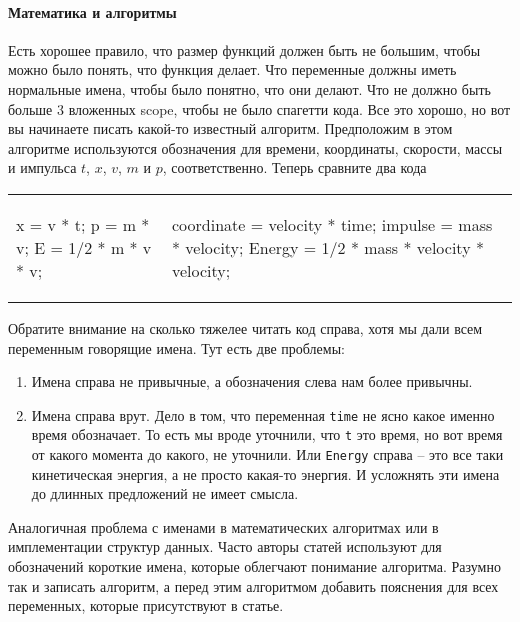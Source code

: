\paragraph{Математика и алгоритмы}

Есть хорошее правило, что размер функций должен быть не большим, чтобы можно было понять, что функция делает.
Что переменные должны иметь нормальные имена, чтобы было понятно, что они делают.
Что не должно быть больше $3$ вложенных scope, чтобы не было спагетти кода.
Все это хорошо, но вот вы начинаете писать какой-то известный алгоритм.
Предположим в этом алгоритме используются обозначения для времени, координаты, скорости, массы и импульса $t$, $x$, $v$, $m$ и $p$, соответственно.
Теперь сравните два кода
\begin{center}
\begin{tabular}{ll}
{
\begin{minipage}[\baselineskip]{8cm}
\begin{cppcode}[numbers = none]
x = v * t;
p = m * v;
E = 1/2 * m * v * v;
\end{cppcode}
\end{minipage}
}&{
\begin{minipage}[\baselineskip]{8cm}
\begin{cppcode}[numbers = none]
coordinate = velocity * time;
impulse = mass * velocity;
Energy = 1/2 * mass * velocity * velocity;
\end{cppcode}
\end{minipage}
}\\
\end{tabular}
\end{center}
Обратите внимание на сколько тяжелее читать код справа, хотя мы дали всем переменным говорящие имена.
Тут есть две проблемы:
\begin{enumerate}
\item Имена справа не привычные, а обозначения слева нам более привычны.

\item Имена справа врут.
Дело в том, что переменная \verb"time" не ясно какое именно время обозначает.
То есть мы вроде уточнили, что \verb"t" это время, но вот время от какого момента до какого, не уточнили.
Или \verb"Energy" справа -- это все таки кинетическая энергия, а не просто какая-то энергия.
И усложнять эти имена до длинных предложений не имеет смысла.
\end{enumerate}
Аналогичная проблема с именами в математических алгоритмах или в имплементации структур данных.
Часто авторы статей используют для обозначений короткие имена, которые облегчают понимание алгоритма.
Разумно так и записать алгоритм, а перед этим алгоритмом добавить пояснения для всех переменных, которые присутствуют в статье.

